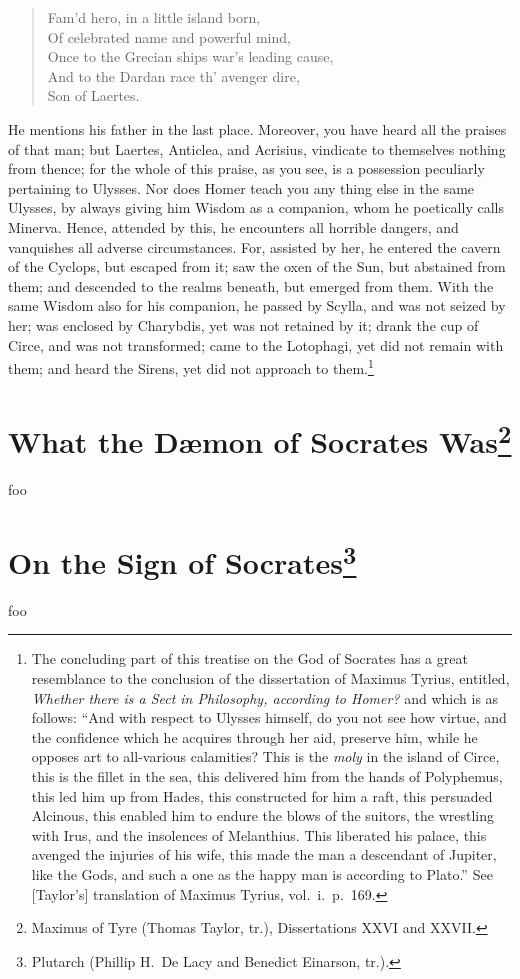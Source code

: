 \documentclass{article}
\begin{document}
\begin{verse}
Fam'd hero, in a little island born,\\
Of celebrated name and powerful mind,\\
Once to the Grecian ships war's leading cause,\\
And to the Dardan race th' avenger dire,\\
Son of Laertes.
\end{verse}

\noindent He mentions his father in the last place. Moreover, you have heard
all the praises of that man; but Laertes, Anticlea, and Acrisius, vindicate
to themselves nothing from thence; for the whole of this praise, as you see, is
a possession peculiarly pertaining to Ulysses. Nor does Homer teach you any
thing else in the same Ulysses, by always giving him Wisdom as a companion,
whom he poetically calls Minerva. Hence, attended by this, he encounters all
horrible dangers, and vanquishes all adverse circumstances. For, assisted by
her, he entered the cavern of the Cyclops, but escaped from it; saw the oxen of
the Sun, but abstained from them; and descended to the realms beneath, but
emerged from them. With the same Wisdom also for his companion, he passed by
Scylla, and was not seized by her; was enclosed by Charybdis, yet was not
retained by it; drank the cup of Circe, and was not transformed; came to the
Lotophagi, yet did not remain with them; and heard the Sirens, yet did not
approach to them.\footnote{The concluding part of this treatise on the God of
Socrates has a great resemblance to the conclusion of the dissertation of
Maximus Tyrius, entitled, \textit{Whether there is a Sect in Philosophy,
according to Homer?} and which is as follows: ``And with respect to Ulysses
himself, do you not see how virtue, and the confidence which he acquires
through her aid, preserve him, while he opposes art to all-various calamities?
This is the \textit{moly} in the island of Circe, this is the fillet in the
sea, this delivered him from the hands of Polyphemus, this led him up from
Hades, this constructed for him a raft, this persuaded Alcinous, this enabled
him to endure the blows of the suitors, the wrestling with Irus, and the
insolences of Melanthius. This liberated his palace, this avenged the injuries
of his wife, this made the man a descendant of Jupiter, like the Gods, and such
a one as the happy man is according to Plato.'' See [Taylor's] translation of
Maximus Tyrius, vol.~i.~p.~169.}


\section*{What the D{\ae}mon of Socrates Was\footnote{Maximus of Tyre (Thomas
Taylor, tr.), Dissertations XXVI and XXVII.}}

foo


\section*{On the Sign of Socrates\footnote{Plutarch (Phillip H.~De Lacy and Benedict Einarson, tr.).}}

foo
\end{document}
